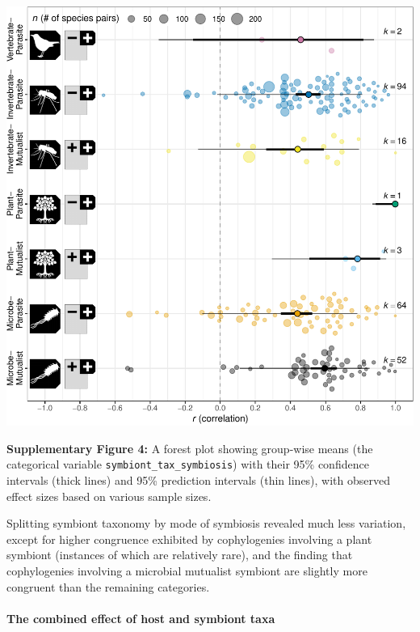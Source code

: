 \documentclass[
]{article}
\begin{document}
\includegraphics{Supporting_Information_files/figure-latex/unnamed-chunk-44-1.pdf}

\textbf{Supplementary Figure 4:} A forest plot showing group-wise means
(the categorical variable \texttt{symbiont\_tax\_symbiosis}) with their
95\% confidence intervals (thick lines) and 95\% prediction intervals
(thin lines), with observed effect sizes based on various sample sizes.

Splitting symbiont taxonomy by mode of symbiosis revealed much less
variation, except for higher congruence exhibited by cophylogenies
involving a plant symbiont (instances of which are relatively rare), and
the finding that cophylogenies involving a microbial mutualist symbiont
are slightly more congruent than the remaining categories.

\hypertarget{the-combined-effect-of-host-and-symbiont-taxa}{%
\paragraph{The combined effect of host and symbiont
taxa}\label{the-combined-effect-of-host-and-symbiont-taxa}}
\end{document}
